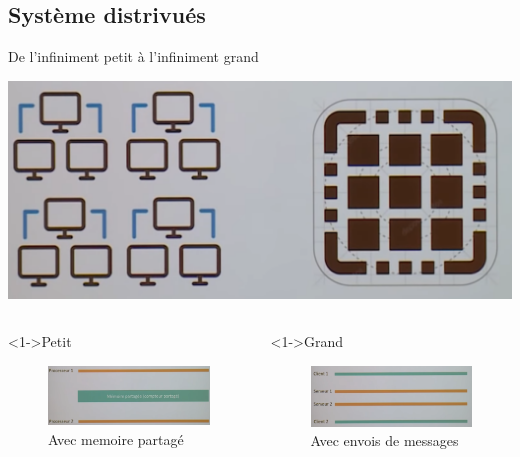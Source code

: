 \documentclass[presentation]{beamer}
\begin{document}
\subsection{Système distrivués}
\label{sec:orgaf3e8dd}
\begin{frame}[label={sec:org5a1062d}]{De l'infiniment petit à l'infiniment grand}
\begin{center}
\includegraphics[width=.6\textwidth]{Images/grand_petit.png}
\end{center}

\begin{columns}
\begin{column}{0.46\columnwidth}
\begin{block}<1->{Petit}
\begin{figure}[htbp]
\centering
\includegraphics[width=.8\textwidth]{Images/memoire_partagee.png}
\caption{Avec memoire partagé}
\end{figure}
\end{block}
\end{column}


\begin{column}{0.46\columnwidth}
\begin{block}<1->{Grand}
\begin{figure}[htbp]
\centering
\includegraphics[width=.8\textwidth]{Images/envoi_message.png}
\caption{Avec envois de messages}
\end{figure}
\end{block}
\end{column}
\end{columns}
\end{frame}
\end{document}

